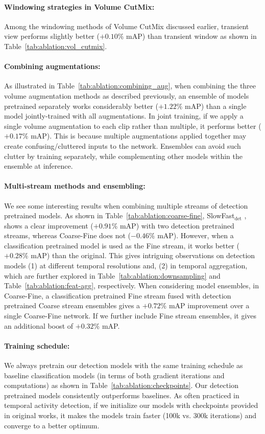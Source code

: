 \documentclass[letterpaper]{article} \usepackage{aaai23}  \usepackage{times}  \usepackage{helvet}  \usepackage{courier}  \usepackage[hyphens]{url}  \usepackage{graphicx} \urlstyle{rm} \def\UrlFont{\rm}  \usepackage{natbib}  \usepackage{caption} \frenchspacing  \setlength{\pdfpagewidth}{8.5in}  \setlength{\pdfpageheight}{11in}  \usepackage{algorithm}
\newcommand{\tref}[1]{Table~\ref{#1}}
\newcommand{\ch}{}
\begin{document}
\paragraph{Windowing strategies in Volume CutMix:} Among the windowing methods of Volume CutMix discussed earlier, transient view performs slightly better ($+0.10\%$ mAP) than transient window as shown in \tref{tab:ablation:vol_cutmix}.

\paragraph{Combining augmentations:} As illustrated in \tref{tab:ablation:combining_aug}, when combining the three volume augmentation methods as described previously, an ensemble of models pretrained separately works considerably better ($+1.22\%$ mAP) than a single model jointly-trained with all augmentations. \ch{In joint training, if we apply a single volume augmentation to each clip rather than multiple, it performs better ($+0.17\%$ mAP).} This is because multiple augmentations applied together may create confusing/cluttered inputs to the network. Ensembles can avoid such clutter by training separately, while complementing other models within the ensemble at inference.

\paragraph{Multi-stream methods and ensembling:} We see some interesting results when combining multiple streams of detection pretrained models. As shown in \tref{tab:ablation:coarse-fine}, SlowFast$_\text{det}$ \cite{feichtenhofer2019slowfast}, shows a clear improvement ($+0.91\%$ mAP) with two detection pretrained streams, whereas Coarse-Fine \cite{kahatapitiya2021coarse} does not ($-0.46\%$ mAP). However, when a classification pretrained model is used as the Fine stream, it works better ($+0.28\%$ mAP) than the original. This gives intriguing observations on detection models (1) at different temporal resolutions and, (2) in temporal aggregation, which are further explored in \tref{tab:ablation:downsampling} and \tref{tab:ablation:feat-agg}, respectively. When considering model ensembles, in Coarse-Fine, a classification pretrained Fine stream fused with detection pretrained Coarse stream ensembles gives a $+0.72\%$ mAP improvement over a single Coarse-Fine network. If we further include Fine stream ensembles, it gives an additional boost of $+0.32\%$ mAP.

\paragraph{Training schedule:} \ch{We always pretrain our detection models with the same training schedule as baseline classification models (in terms of both gradient iterations and computations) as shown in \tref{tab:ablation:checkpoints}. Our detection pretrained models consistently outperforms baselines. As often practiced in temporal activity detection, if we initialize our models with checkpoints provided in original works, it makes the models train faster (100k vs. 300k iterations) and converge to a better optimum.}
\end{document}
